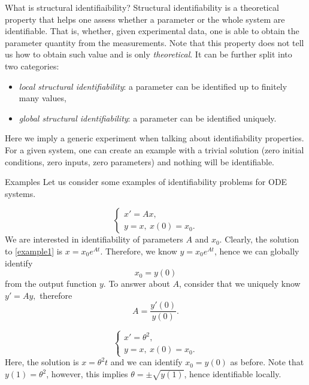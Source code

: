 \documentclass[final]{beamer}
\newlength{\colwidth}
\begin{document}
\begin{frame}[t]
\begin{columns}[t]
\begin{column}{\colwidth}
      \begin{block}{What is structural identifiaibility?}
        Structural identifiability is a theoretical property that helps one assess whether a parameter or the whole system are identifiable. That is, whether, given experimental data, one is able to obtain the parameter quantity from the measurements.
        Note that this property does not tell us how to obtain such value and is only \emph{theoretical}. It can be further split into two categories:
        \begin{itemize}
          \item \emph{local structural identifiability}: a parameter can be identified up to finitely many values,
          \item \emph{global structural identifiability}: a parameter can be identified uniquely.
        \end{itemize}
        Here we imply a generic experiment when talking about identifiability properties. For a given system, one can create an example with a trivial solution (zero initial conditions, zero inputs, zero parameters) and nothing will be identifiable.
      \end{block}

      \begin{block}{Examples}
        Let us consider some examples of identifiability problems for ODE systems.
        \begin{example}[1]
          \begin{equation}
            \begin{cases}
              x'=Ax, \\
              y=x,~x(0)=x_0.
            \end{cases}
            \label{example1}
          \end{equation}
          We are interested in identifiability of parameters \(A\) and \(x_0\). Clearly, the solution to \ref{example1} is \(x=x_0e^{At}\). Therefore, we know \(y=x_0e^{At}\), hence we can globally identify \[x_0=y(0)\]
          from the output function \(y\). To answer about \(A\), consider that we uniquely know \(y'=Ay,\)
          therefore \[A=\frac{y'(0)}{y(0)}.\]
        \end{example}

        \begin{example}[2]
          \begin{equation}
            \begin{cases}
              x'=\theta^2, \\
              y=x,~x(0)=x_0.
            \end{cases}
            \label{example2}
          \end{equation}
          Here, the solution is \(x=\theta^2t\) and we can identify \(x_0=y(0)\) as before. Note that \(y(1)=\theta^2\), however, this implies \(\theta=\pm \sqrt{y(1)}\), hence identifiable locally.
        \end{example}
      \end{block}


\end{column}
\end{columns}
\end{frame}
\end{document}
